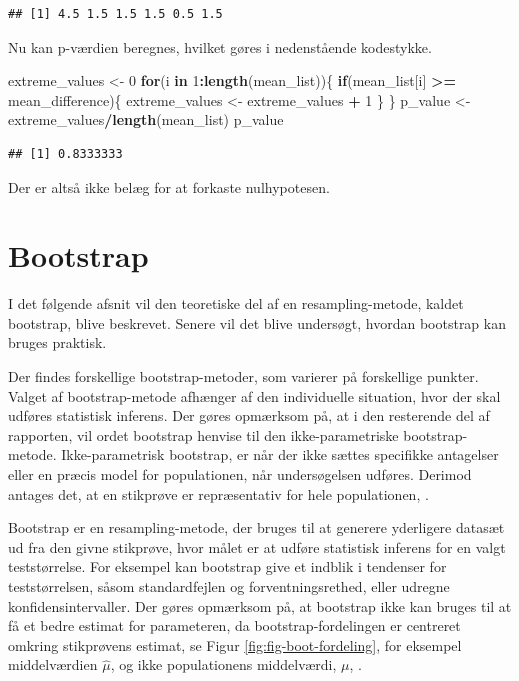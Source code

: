 \documentclass[
]{book}
\newenvironment{Shaded}{\begin{snugshade}}{\end{snugshade}}
\newcommand{\ControlFlowTok}[1]{\textcolor[rgb]{0.13,0.29,0.53}{\textbf{#1}}}
\newcommand{\DecValTok}[1]{\textcolor[rgb]{0.00,0.00,0.81}{#1}}
\newcommand{\KeywordTok}[1]{\textcolor[rgb]{0.13,0.29,0.53}{\textbf{#1}}}
\newcommand{\NormalTok}[1]{#1}
\newcommand{\OperatorTok}[1]{\textcolor[rgb]{0.81,0.36,0.00}{\textbf{#1}}}
\newcommand{\StringTok}[1]{\textcolor[rgb]{0.31,0.60,0.02}{#1}}
\theoremstyle{definition}
\theoremstyle{definition}
\theoremstyle{definition}
\theoremstyle{remark}
\begin{document}
\begin{verbatim}
## [1] 4.5 1.5 1.5 1.5 0.5 1.5
\end{verbatim}

Nu kan p-værdien beregnes, hvilket gøres i nedenstående kodestykke.

\begin{Shaded}
\begin{Highlighting}[]
\NormalTok{extreme_values <-}\StringTok{ }\DecValTok{0}
\ControlFlowTok{for}\NormalTok{(i }\ControlFlowTok{in} \DecValTok{1}\OperatorTok{:}\KeywordTok{length}\NormalTok{(mean_list))\{}
  \ControlFlowTok{if}\NormalTok{(mean_list[i] }\OperatorTok{>=}\StringTok{ }\NormalTok{mean_difference)\{}
\NormalTok{    extreme_values <-}\StringTok{ }\NormalTok{extreme_values }\OperatorTok{+}\StringTok{ }\DecValTok{1}
\NormalTok{  \}}
\NormalTok{\}}
\NormalTok{p_value <-}\StringTok{ }\NormalTok{extreme_values}\OperatorTok{/}\KeywordTok{length}\NormalTok{(mean_list)}
\NormalTok{p_value}
\end{Highlighting}
\end{Shaded}

\begin{verbatim}
## [1] 0.8333333
\end{verbatim}

Der er altså ikke belæg for at forkaste nulhypotesen.

\hypertarget{bootstrap}{%
\section{Bootstrap}\label{bootstrap}}

I det følgende afsnit vil den teoretiske del af en resampling-metode, kaldet bootstrap, blive beskrevet. Senere vil det blive undersøgt, hvordan bootstrap kan bruges praktisk.

Der findes forskellige bootstrap-metoder, som varierer på forskellige punkter. Valget af bootstrap-metode afhænger af den individuelle situation, hvor der skal udføres statistisk inferens. Der gøres opmærksom på, at i den resterende del af rapporten, vil ordet bootstrap henvise til den ikke-parametriske bootstrap-metode. Ikke-parametrisk bootstrap, er når der ikke sættes specifikke antagelser eller en præcis model for populationen, når undersøgelsen udføres. Derimod antages det, at en stikprøve er repræsentativ for hele populationen, \citep[side 3]{nonparaboot}.

Bootstrap er en resampling-metode, der bruges til at generere yderligere datasæt ud fra den givne stikprøve, hvor målet er at udføre statistisk inferens for en valgt teststørrelse. For eksempel kan bootstrap give et indblik i tendenser for teststørrelsen, såsom standardfejlen og forventningsrethed, eller udregne konfidensintervaller. Der gøres opmærksom på, at bootstrap ikke kan bruges til at få et bedre estimat for parameteren, da bootstrap-fordelingen er centreret omkring stikprøvens estimat, se Figur \ref{fig:fig-boot-fordeling}, for eksempel middelværdien \(\hat {\mu}\), og ikke populationens middelværdi, \(\mu\), \citep[ s. 114]{BootvsJack}.
\end{document}
